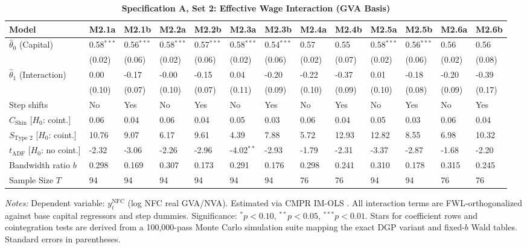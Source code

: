 \FloatBarrier
\begin{table}[h!]
\centering
\caption{\textbf{Specification A, Set 2: Effective Wage Interaction (GVA Basis)}}
\label{tab:specA_set2_gva_app}
\tiny
\setlength{\tabcolsep}{1.5pt}
\begin{tabular}{p{3.2cm}p{1.0cm}p{1.0cm}p{1.0cm}p{1.0cm}p{1.0cm}p{1.0cm}p{1.0cm}p{1.0cm}p{1.0cm}p{1.0cm}p{1.0cm}p{1.0cm}}
\toprule
Model & M2.1a & M2.1b & M2.2a & M2.2b & M2.3a & M2.3b & M2.4a & M2.4b & M2.5a & M2.5b & M2.6a & M2.6b \\
\midrule
$\hat{\theta}_0$ (Capital) & 0.58$^{***}$ & 0.56$^{***}$ & 0.58$^{***}$ & 0.57$^{***}$ & 0.58$^{***}$ & 0.54$^{***}$ & 0.57 & 0.55 & 0.58$^{***}$ & 0.56$^{***}$ & 0.56 & 0.56 \\
 & (0.02) & (0.06) & (0.02) & (0.06) & (0.02) & (0.06) & (0.02) & (0.07) & (0.02) & (0.06) & (0.02) & (0.08) \\
$\hat{\theta}_1$ (Interaction) & 0.00 & -0.17 & -0.00 & -0.15 & 0.04 & -0.20 & -0.22 & -0.37 & 0.01 & -0.18 & -0.20 & -0.39 \\
 & (0.10) & (0.07) & (0.10) & (0.07) & (0.11) & (0.09) & (0.10) & (0.09) & (0.10) & (0.08) & (0.09) & (0.17) \\
\midrule
Step shifts & No & Yes & No & Yes & No & Yes & No & Yes & No & Yes & No & Yes \\
$C_{\text{Shin}}$ [$H_0$: coint.] & 0.06 & 0.04 & 0.06 & 0.04 & 0.05 & 0.03 & 0.06 & 0.04 & 0.05 & 0.03 & 0.06 & 0.04 \\
$S_{\text{Type 2}}$ [$H_0$: coint.] & 10.76 & 9.07 & 6.17 & 9.61 & 4.39 & 7.88 & 5.72 & 12.93 & 12.82 & 8.55 & 6.98 & 10.32 \\
$t_{\text{ADF}}$ [$H_0$: no coint.] & -2.32 & -3.06 & -2.26 & -2.96 & -4.02$^{**}$ & -2.93 & -1.79 & -2.31 & -3.37 & -2.87 & -1.68 & -2.20 \\
Bandwidth ratio $b$ & 0.298 & 0.169 & 0.307 & 0.173 & 0.291 & 0.176 & 0.298 & 0.241 & 0.310 & 0.178 & 0.315 & 0.245 \\
Sample Size $T$ & 94 & 94 & 94 & 94 & 94 & 94 & 76 & 76 & 94 & 94 & 76 & 76 \\
\bottomrule
\end{tabular}
\begin{minipage}{\textwidth}
\scriptsize
\textit{Notes:} Dependent variable: $y_t^{\text{NFC}}$ (log NFC real GVA/NVA). Estimated via CMPR IM-OLS \citep{VogelsangWagner2014}. All interaction terms are FWL-orthogonalized against base capital regressors and step dummies. Significance: $^*p<0.10$, $^{**}p<0.05$, $^{***}p<0.01$. Stars for coefficient rows and cointegration tests are derived from a 100,000-pass Monte Carlo simulation suite mapping the exact DGP variant and fixed-$b$ Wald tables. Standard errors in parentheses.
\end{minipage}
\end{table}


